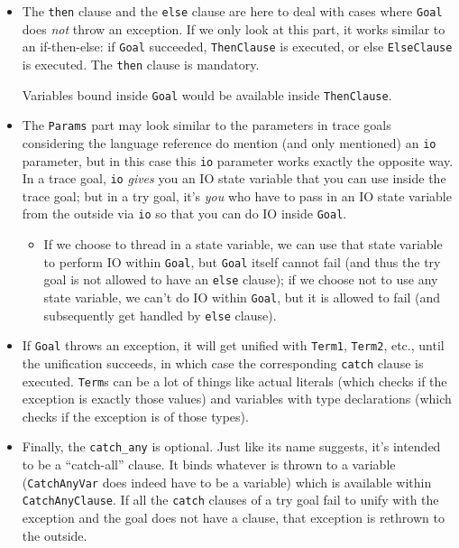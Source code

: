 \begin{itemize}
\item The \texttt{then} clause and the \texttt{else} clause are here to deal with cases where \texttt{Goal} does \textit{not} throw an exception. If we only look at this part, it works similar to an if-then-else: if \texttt{Goal} succeeded, \texttt{ThenClause} is executed, or else \texttt{ElseClause} is executed. The \texttt{then} clause is mandatory.

  Variables bound inside \texttt{Goal} would be available inside \texttt{ThenClause}.
\item The \texttt{Params} part may look similar to the parameters in trace goals considering the language reference do mention (and only mentioned) an \texttt{io} parameter, but in this case this \texttt{io} parameter works exactly the opposite way. In a trace goal, \texttt{io} \textit{gives} you an IO state variable that you can use inside the trace goal; but in a try goal, it's \textit{you} who have to pass in an IO state variable from the outside via \texttt{io} so that you can do IO inside \texttt{Goal}.
  \begin{itemize}
  \item If we choose to thread in a state variable, we can use that state variable to perform IO within \texttt{Goal}, but \texttt{Goal} itself cannot fail (and thus the try goal is not allowed to have an \texttt{else} clause); if we choose not to use any state variable, we can't do IO within \texttt{Goal}, but it is allowed to fail (and subsequently get handled by \texttt{else} clause).
  \end{itemize}
  \item If \texttt{Goal} throws an exception, it will get unified with \texttt{Term1}, \texttt{Term2}, etc., until the unification succeeds, in which case the corresponding \texttt{catch} clause is executed. \texttt{Term}s can be a lot of things like actual literals (which checks if the exception is exactly those values) and variables with type declarations (which checks if the exception is of those types).
  \item Finally, the \texttt{catch_any} is optional. Just like its name suggests, it's intended to be a ``catch-all'' clause. It binds whatever is thrown to a variable (\texttt{CatchAnyVar} does indeed have to be a variable) which is available within \texttt{CatchAnyClause}. If all the \texttt{catch} clauses of a try goal fail to unify with the exception and the goal does not have a  clause, that exception is rethrown to the outside.
\end{itemize}

